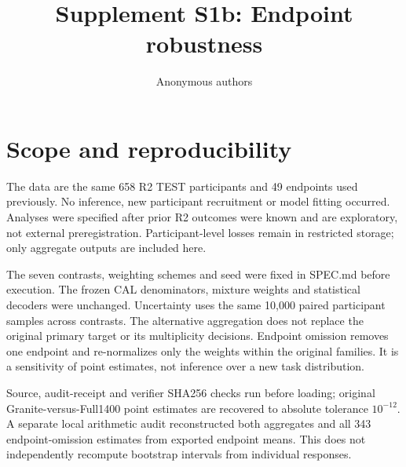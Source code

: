 \documentclass[10pt]{article}
\title{Supplement S1b: Endpoint robustness}
\author{Anonymous authors}
\date{}
\begin{document}
\maketitle
\section{Scope and reproducibility}
The data are the same 658 R2 TEST participants and 49 endpoints used previously. No inference, new participant recruitment or model fitting occurred. Analyses were specified after prior R2 outcomes were known and are exploratory, not external preregistration. Participant-level losses remain in restricted storage; only aggregate outputs are included here.

The seven contrasts, weighting schemes and seed were fixed in SPEC.md before execution. The frozen CAL denominators, mixture weights and statistical decoders were unchanged. Uncertainty uses the same 10,000 paired participant samples across contrasts. The alternative aggregation does not replace the original primary target or its multiplicity decisions. Endpoint omission removes one endpoint and re-normalizes only the weights within the original families. It is a sensitivity of point estimates, not inference over a new task distribution.

Source, audit-receipt and verifier SHA256 checks run before loading; original Granite-versus-Full1400 point estimates are recovered to absolute tolerance $10^{-12}$. A separate local arithmetic audit reconstructed both aggregates and all 343 endpoint-omission estimates from exported endpoint means. This does not independently recompute bootstrap intervals from individual responses.
\end{document}
